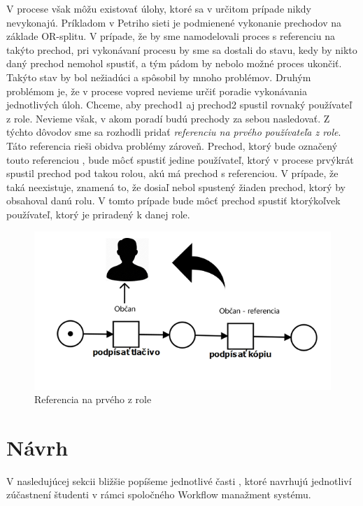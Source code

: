 V procese však môžu existovať úlohy, ktoré sa v určitom prípade nikdy nevykonajú. Príkladom v Petriho sieti je podmienené vykonanie prechodov na základe OR-splitu. V prípade, že by sme namodelovali proces s referenciu na takýto prechod, pri vykonávaní procesu by sme sa dostali do stavu, kedy by nikto daný prechod nemohol spustiť, a tým pádom by nebolo možné proces ukončiť. Takýto stav by bol nežiadúci a spôsobil by mnoho problémov. Druhým problémom je, že v procese vopred nevieme určiť poradie vykonávania jednotlivých úloh. Chceme, aby prechod1 aj prechod2 spustil rovnaký používateľ z role. Nevieme však, v akom poradí budú prechody za sebou nasledovať. Z týchto dôvodov sme sa rozhodli pridať \emph{referenciu na prvého používateľa z role}. Táto referencia rieši obidva problémy zároveň. Prechod, ktorý bude označený touto referenciou , bude môcť spustiť jedine používateľ, ktorý v procese prvýkrát spustil prechod pod takou rolou, akú má prechod s referenciou. V prípade, že taká neexistuje, znamená to, že dosiaľ nebol spustený žiaden prechod, ktorý by obsahoval danú rolu. V tomto prípade bude môcť prechod spustiť ktorýkoľvek používateľ, ktorý je priradený k danej role.

\begin{figure}[h]
	\centering
	\includegraphics[width=0.7\linewidth]{images/referencia2}
	\caption{Referencia na prvého z role}
	\label{fig:referencia na prvého z role}
\end{figure}




\section{Návrh}
V nasledujúcej sekcii bližšie popíšeme jednotlivé časti , ktoré navrhujú jednotliví zúčastnení študenti v rámci spoločného Workflow manažment systému.

